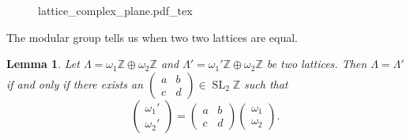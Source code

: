 \documentclass[a4paper]{article}
\newcommand{\incfig}[1]{%
	\def\svgwidth{\columnwidth}
	{#1.pdf_tex}
}
\theoremstyle{theoremdd}
\newtheorem{lemma}[theorem]{Lemma}
\theoremstyle{definitiondd}
\theoremstyle{remarkdd}
\newcommand{\Z}{\mathbb{Z}}
\DeclareMathOperator{\SL}{SL}
\begin{document}
\begin{figure}[h]
	\centering
	\incfig{lattice_complex_plane}
\end{figure}

The modular group tells us when two two lattices are equal. 
\begin{lemma}\label{lem:equality_of_lattices}
	Let $\Lambda = \omega_1\Z \oplus \omega_2\Z$ and $\Lambda' = \omega_1'\Z \oplus \omega_2\Z$ be two lattices. 
	Then $\Lambda = \Lambda'$ if and only if there exists an $\begin{pmatrix} a & b \\ c& d \end{pmatrix} \in \SL_2\Z$ such that \[
	\begin{pmatrix} \omega_1' \\ \omega_2' \end{pmatrix}  = 
	\begin{pmatrix} a & b \\ c& d \end{pmatrix} 
	\begin{pmatrix} \omega_1 \\ \omega_2 \end{pmatrix} 
	.\] 
\end{lemma}
\end{document}
